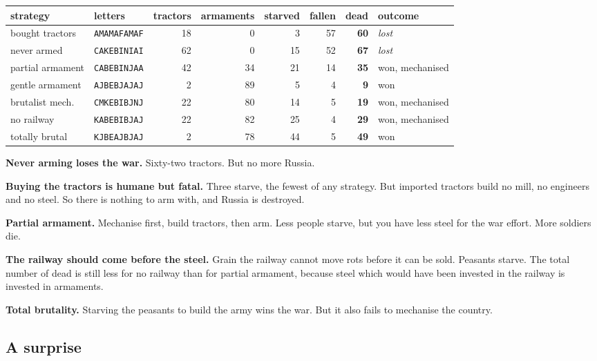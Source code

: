 \documentclass[11pt,a4paper]{article}
\begin{document}
\begin{center}\small
\begin{tabular}{@{}llrrrrrl@{}}
\toprule
strategy & letters & tractors & armaments & starved & fallen & \textbf{dead} & outcome \\
\midrule
bought tractors   & \texttt{AMAMAFAMAF} & 18 &  0 &  3 & 57 & \textbf{60} & \emph{lost} \\
never armed       & \texttt{CAKEBINIAI} & 62 &  0 & 15 & 52 & \textbf{67} & \emph{lost} \\
partial armament  & \texttt{CABEBINJAA} & 42 & 34 & 21 & 14 & \textbf{35} & won, mechanised \\
gentle armament   & \texttt{AJBEBJAJAJ} &  2 & 89 &  5 &  4 & \textbf{9}  & won \\
brutalist mech.   & \texttt{CMKEBIBJNJ} & 22 & 80 & 14 &  5 & \textbf{19} & won, mechanised \\
no railway        & \texttt{KABEBIBJAJ} & 22 & 82 & 25 &  4 & \textbf{29} & won, mechanised \\
totally brutal    & \texttt{KJBEAJBJAJ} &  2 & 78 & 44 &  5 & \textbf{49} & won \\
\bottomrule
\end{tabular}
\end{center}

\vspace{5mm}

\textbf{Never arming loses the war.} Sixty-two tractors. But no more Russia.

\textbf{Buying the tractors is humane but fatal.} Three starve, the fewest of any strategy. But
imported tractors build no mill, no engineers and no steel. So there is nothing to arm with, and
Russia is destroyed.

\textbf{Partial armament.} Mechanise first, build tractors, then arm. Less people starve, but you
have less steel for the war effort. More soldiers die.

\textbf{The railway should come before the steel.} Grain the railway cannot move rots before it can
be sold. Peasants starve. The total number of dead is still less for no railway than for partial
armament, because steel which would have been invested in the railway is invested in armaments.

\textbf{Total brutality.} Starving the peasants to build the army wins the war. But it also fails
to mechanise the country.

\subsection{A surprise}
\end{document}
